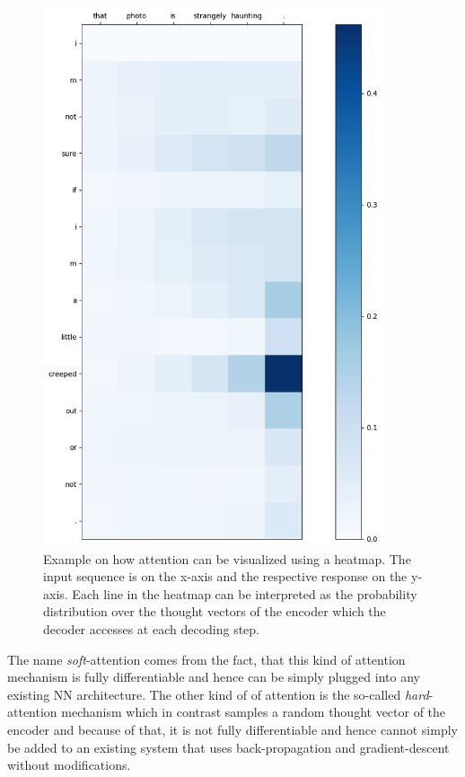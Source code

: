 \begin{figure}[H]
	\centering
	\includegraphics[width=10cm]{img/attention_heatmap_example}
	\caption{Example on how attention can be visualized using a heatmap. The input sequence is on the x-axis and the respective response on the y-axis. Each line in the heatmap can be interpreted as the probability distribution over the thought vectors of the encoder which the decoder accesses at each decoding step.}
	\label{fundamentals:seq2seq:attention_weights_visualization}
\end{figure}

The name \emph{soft}-attention comes from the fact, that this kind of attention mechanism is fully differentiable and hence can be simply plugged into any existing NN architecture. The other kind of of attention is the so-called \emph{hard}-attention mechanism which in contrast samples a random thought vector of the encoder and because of that, it is not fully differentiable and hence cannot simply be added to an existing system that uses back-propagation and gradient-descent without modifications.

